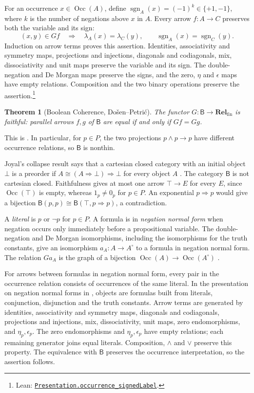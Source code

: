 \documentclass[11pt]{article}
\newtheorem{theorem}{Theorem}[section]
\newcommand{\B}{\mathsf B}
\newcommand{\Occ}{\operatorname{Occ}}
\newcommand{\Rel}{\mathbf{Rel}_{\mathrm{fin}}}
\begin{document}
For an occurrence $x\in\Occ(A)$, define
$\operatorname{sgn}_A(x)=(-1)^k\in\{+1,-1\}$, where $k$ is the
number of negations above $x$ in $A$. Every arrow $f:A\to C$
preserves both the variable and its sign:
\[
 (x,y)\in Gf\quad\Longrightarrow\quad
 \lambda_A(x)=\lambda_C(y),\qquad
 \operatorname{sgn}_A(x)=\operatorname{sgn}_C(y).
\]
Induction on arrow terms proves this assertion. Identities,
associativity and symmetry maps, projections and injections,
diagonals and codiagonals, mix, dissociativity and unit maps
preserve the variable and its sign. The double-negation and
De Morgan maps preserve the signs, and the zero,
$\eta$ and $\epsilon$ maps have empty relations. Composition and
the two binary operations preserve the assertion.\footnote{\raggedright Lean:
\href{https://github.com/flengyel/Dosen-Petric-Maximality/blob/5dbee39bea09539bd130f729e82636419f71f920/DosenPetric/PresentationSignedLabels.lean\#L73}{\texttt{Presentation.\allowbreak{}occurrence\_signedLabel}}.}

\begin{theorem}[Boolean Coherence, Do\v{s}en--Petri\'c]
\label{thm:coherence}
The functor $G:\B\to\Rel$ is faithful: parallel arrows $f,g$ of
$\B$ are equal if and only if $Gf=Gg$.
\end{theorem}

This is \cite[\S14.2, p.~321]{DP}. In particular, for $p\in P$, the
two projections $p\wedge p\to p$ have different occurrence
relations, so $\B$ is nonthin.

Joyal's collapse result says that a cartesian closed category with
an initial object $\bot$ is a preorder if
$A\cong(A\Rightarrow\bot)\Rightarrow\bot$ for every object $A$
\cite[\S14.3, p.~324]{DP}.
The category $\B$ is not cartesian closed. Faithfulness gives at most
one arrow $\top\to E$ for every $E$, since $\Occ(\top)$ is empty,
whereas $1_p\ne0_p$ for $p\in P$. An exponential $p\Rightarrow p$
would give a bijection $\B(p,p)\cong\B(\top,p\Rightarrow p)$,
a contradiction.

A \emph{literal} is $p$ or $\neg p$ for $p\in P$.
A formula is in \emph{negation normal form} when negation occurs only
immediately before a propositional variable. The double-negation and
De Morgan isomorphisms, including the isomorphisms for the truth
constants, give an isomorphism $a_A:A\to A^\circ$ to a formula in
negation normal form. The relation $Ga_A$ is the graph of a bijection
$\Occ(A)\to\Occ(A^\circ)$
\cite[\S14.1, pp.~313--315]{DP}.

For arrows between formulas in negation normal form, every pair in
the occurrence relation consists of occurrences of the same literal.
In the presentation on negation normal forms in
\cite[\S14.2, pp.~318--321]{DP}, objects are formulas built from
literals, conjunction, disjunction and the truth constants.
Arrow terms are generated by identities, associativity and symmetry
maps, diagonals and codiagonals, projections and injections, mix,
dissociativity, unit maps, zero endomorphisms, and $\eta_p,\epsilon_p$.
The zero endomorphisms and $\eta_p,\epsilon_p$ have empty relations;
each remaining generator joins equal literals.
Composition, $\wedge$ and $\vee$ preserve this property.
The equivalence with $\B$ preserves the occurrence interpretation,
so the assertion follows.
\end{document}
